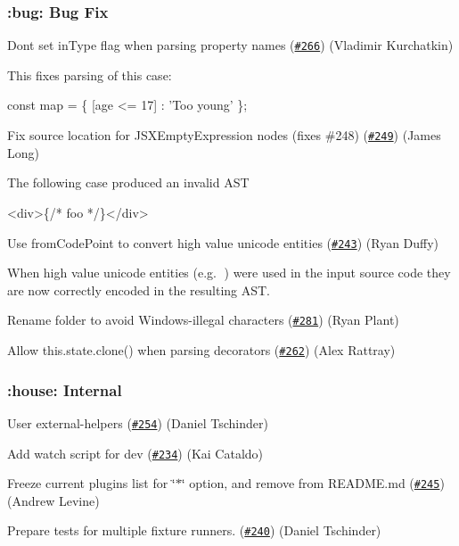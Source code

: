 \subsubsection*{\+:bug\+: Bug Fix}

Don\textquotesingle{}t set in\+Type flag when parsing property names (\href{https://github.com/babel/babylon/pull/266}{\tt \#266}) (Vladimir Kurchatkin)

This fixes parsing of this case\+:


\begin{DoxyCode}
const map = \{
  [age <= 17] : 'Too young'
\};
\end{DoxyCode}


Fix source location for J\+S\+X\+Empty\+Expression nodes (fixes \#248) (\href{https://github.com/babel/babylon/pull/249}{\tt \#249}) (James Long)

The following case produced an invalid A\+ST 
\begin{DoxyCode}
<div>\{/* foo */\}</div>
\end{DoxyCode}


Use from\+Code\+Point to convert high value unicode entities (\href{https://github.com/babel/babylon/pull/243}{\tt \#243}) (Ryan Duffy)

When high value unicode entities (e.\+g. 💩) were used in the input source code they are now correctly encoded in the resulting A\+ST.

Rename folder to avoid Windows-\/illegal characters (\href{https://github.com/babel/babylon/pull/281}{\tt \#281}) (Ryan Plant)

Allow this.\+state.\+clone() when parsing decorators (\href{https://github.com/babel/babylon/pull/262}{\tt \#262}) (Alex Rattray)

\subsubsection*{\+:house\+: Internal}

User external-\/helpers (\href{https://github.com/babel/babylon/pull/254}{\tt \#254}) (Daniel Tschinder)

Add watch script for dev (\href{https://github.com/babel/babylon/pull/234}{\tt \#234}) (Kai Cataldo)

Freeze current plugins list for \char`\"{}$\ast$\char`\"{} option, and remove from R\+E\+A\+D\+M\+E.\+md (\href{https://github.com/babel/babylon/pull/245}{\tt \#245}) (Andrew Levine)

Prepare tests for multiple fixture runners. (\href{https://github.com/babel/babylon/pull/240}{\tt \#240}) (Daniel Tschinder)

